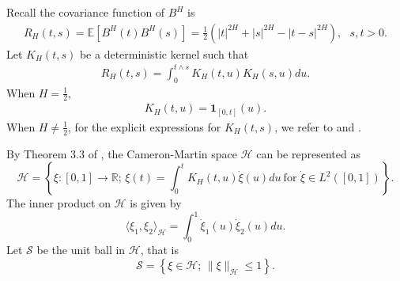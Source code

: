 \documentclass[11pt, reqno]{amsart}
\numberwithin{equation}{section}
\newcommand{\1}{{\bf 1}}
\newcommand{\2}{{\bf 2}}
\begin{document}
   
 {
Recall  the  covariance function  of $B^H$ is }
 \begin{align}\label{eq cov 1}  {
R_H(t, s)=\mathbb E\left[B^H(t) B^H(s) \right]=\frac12\left(|t|^{2H}+|s|^{2H}-|t-s|^{2H}\right), \ \ \ s, t>0. }
 \end{align} {
 Let $K_H(t, s)$ be a deterministic kernel such that }
 \begin{align}\label{eq cov 2}  {
 R_H(t, s)=\int_0^{t\wedge s}K_H(t, u)K_H(s, u)du. }
 \end{align}  {
 When $H=\frac12$, }
 \begin{align}\label{eq KH1} {
 K_H(t, u)=\mathbf 1_{[0,t]}(u).  }
 \end{align} {
    When $H\neq \frac12$, for the explicit expressions for $K_H(t, s)$, we refer to    \cite[Chapter 2.1]{BHOZ} and  \cite[Section 3]{DU99}.}
    
 {
  By Theorem 3.3 of \cite{DU99},   the Cameron-Martin space $\mathcal H$    can be represented  as }
\begin{equation}\label{eq CM}
 { \mathcal H=\left\{\xi: [0,1]\rightarrow \mathbb R;\, \xi(t)=\int_0^t K_H(t, u) \dot \xi(u)du  \ \text{for  } \dot \xi\in L^2([0,1])\right\}. }
\end{equation}
 {
The inner product on $\mathcal H$ is given by }
\begin{equation}\label{eq inn 2}  {
\langle \xi_1, \xi_2\rangle_{\mathcal H}=\int_0^1 \dot \xi_1(u) \dot \xi_2(u) du.}
\end{equation}
 {
Let $\mathscr S$ be the unit ball in $\mathcal H$, that is 
$$
\mathscr S=\left\{\xi\in \mathcal H;\, \|\xi\|_{\mathcal H}\le 1 \right\}.
$$}
\end{document}
